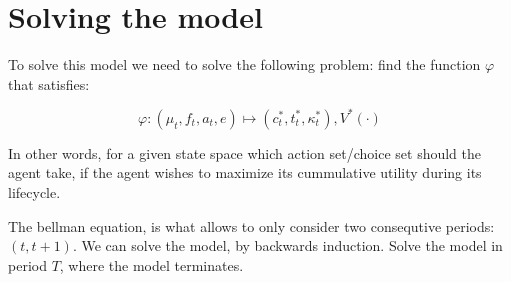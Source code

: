 \section{Solving the model}

To solve this model we need to solve the following problem: find the function $\varphi$ that satisfies:

\begin{equation}
    \varphi : (\mu_t, f_t, a_t , e) \mapsto (c_t^{*}, t^{*}_t, \kappa_t^{*}), V^{*}(\cdot)
\end{equation}

In other words, for a given state space which action set/choice set should the agent take, if the agent wishes to maximize its cummulative utility during its lifecycle.

The bellman equation, is what allows to only consider two consequtive periods: $(t, t+1)$. We can solve the model, by backwards induction. Solve the model in period $T$, where the model terminates.
